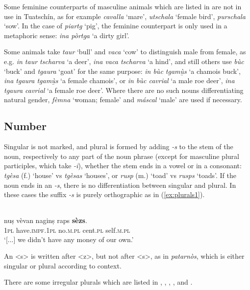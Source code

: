 Some feminine counterparts of masculine animals which are listed in \citet[239f.]{Spescha1989} are not in use in Tuatschín, as for example \textit{cavalla} `mare', \textit{utschala} `female bird', \textit{purschala} `sow'. In the case of \textit{piartg} `pig', the feminine counterpart is only used in a metaphoric sense: \textit{ina pòrtga} `a dirty girl'.

Some animals take \textit{taur} `bull' and \textit{vaca} `cow' to distinguish male from female, as e.g. \textit{in taur tscharva} `a deer', \textit{ina vaca tscharva} `a hind', and still others use \textit{bùc} `buck' and \textit{tgaura} `goat' for the same purpose: \textit{in bùc tgamù̱s} `a chamois buck', \textit{ina tgaura tgamù̱s} `a female chamois', or \textit{in bùc cavrial} `a male roe deer', \textit{ina tgaura cavrial} `a female roe deer'. Where there are no such nouns differentiating natural gender, \textit{fèmna} `woman; female' and \textit{máscal} `male' are used if necessary.



\subsection{Number}
Singular is not marked, and plural is formed by adding \textit{-s} to the stem of the noun, respectively to any part of the noun phrase (except for masculine plural participles, which take \textit{-i}), whether the stem ends in a vowel or in a consonant: \textit{tgèsa} (f.) `house' vs \textit{tgèsas} `houses', or \textit{rusp} (m.) `toad' vs \textit{rusps} `toads'. If the noun ends in an \textit{-s}, there is no differentiation between singular and plural. In these cases the suffix \textit{-s} is purely orthographic as in (\ref{ex:plurals1}). 

\ea
\label{ex:plurals1}
\\
\gll [...] nuṣ vèvan naginṣ raps \textbf{sèzs}.\\
{} \textsc{1pl} have.\textsc{impf.1pl}  no.\textsc{m.pl} cent.\textsc{pl} self.\textsc{m.pl}\\
\glt `[...] we didn’t have any money of our own.'
\z

An <s> is written after <z>, but not after <s>, as in \textit{patarnòs}, which is either singular or plural according to context.


There are some irregular plurals which are listed in ,  ,  , , and . 

